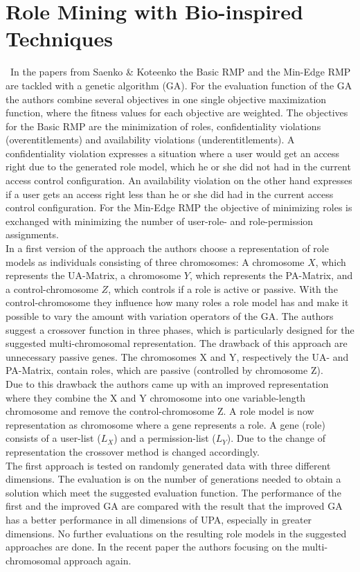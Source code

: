 \section{Role Mining with Bio-inspired Techniques}
\label{sec:relatedWork3}\
In the papers from Saenko \& Koteenko \cite{Igor} \cite{saenko2012design} the Basic RMP and the Min-Edge RMP are tackled with a genetic algorithm (GA). For the evaluation function of the GA the authors combine several objectives in one single objective maximization function, where the fitness values for each objective are weighted. The objectives for the Basic RMP are the minimization of roles, confidentiality violations (overentitlements) and availability violations (underentitlements). A confidentiality violation expresses a situation where a user would get an access right due to the generated role model, which he or she did not had in the current access control configuration. An availability violation on the other hand expresses if a user gets an access right less than he or she did had in the current access control configuration. For the Min-Edge RMP\cite{4497438} the objective of minimizing roles is exchanged with minimizing the number of user-role- and role-permission assignments.\\
In a first version of the approach the authors choose a representation of role models as individuals consisting of three chromosomes: A chromosome $X$, which represents the UA-Matrix, a chromosome $Y$, which represents the PA-Matrix, and a control-chromosome $Z$, which controls if a role is active or passive. With the control-chromosome they influence how many roles a role model has and make it possible to vary the amount with variation operators of the GA. The authors suggest a crossover function in three phases, which is particularly designed for the suggested multi-chromosomal representation. The drawback of this approach are unnecessary passive genes. The chromosomes X and Y, respectively the UA- and PA-Matrix, contain roles, which are passive (controlled by chromosome Z).\\
Due to this drawback the authors came up with an improved representation where they combine the X and Y chromosome into one variable-length chromosome and remove the control-chromosome Z. A role model is now representation as chromosome where a gene represents a role. A gene (role) consists of a user-list ($L_X$) and a permission-list ($L_Y$). Due to the change of representation the crossover method is changed accordingly.\\
The first approach is tested on randomly generated data with three different dimensions\cite{Igor}. The evaluation is on the number of generations needed to obtain a solution which meet the suggested evaluation function. The performance of the first and the improved GA are compared with the result that the improved GA has a better performance in all dimensions of UPA, especially in greater dimensions\cite{saenko2012design}. No further evaluations on the resulting role models in the suggested approaches are done. In the recent paper \cite{Kotenko:2015} the authors focusing on the multi-chromosomal approach again.\\
